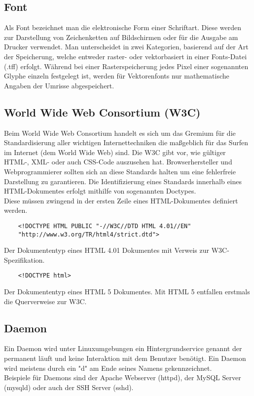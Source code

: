 	\subsection{Font}
	Als Font bezeichnet man die elektronische Form einer Schriftart. Diese werden zur Darstellung von Zeichenketten auf Bildschirmen oder für die Ausgabe am Drucker verwendet. Man unterscheidet in zwei Kategorien, basierend auf der Art der Speicherung, welche entweder raster- oder vektorbasiert in einer Fonts-Datei (.tff) erfolgt.
	Während bei einer Rasterspeicherung jedes Pixel einer sogenannten Glyphe einzeln festgelegt ist, werden für Vektorenfonts nur mathematische Angaben der Umrisse abgespeichert.
	
	\lstset{frame=shadowbox, breaklines=true}

	\subsection{World Wide Web Consortium (W3C)}
		Beim World Wide Web Consortium handelt es sich um das Gremium für die Standardisierung aller wichtigen Internettechniken die maßgeblich für das Surfen im Internet (dem World Wide Web) sind.
		Die W3C gibt vor, wie gültiger HTML-, XML- oder auch CSS-Code auszusehen hat.
		Browserhersteller und Webprogrammierer sollten sich an diese Standards halten um eine fehlerfreie Darstellung zu garantieren. Die Identifizierung eines Standards innerhalb eines HTML-Dokumentes erfolgt mithilfe von sogenannten Doctypes.\\
		Diese müssen zwingend in der ersten Zeile eines HTML-Dokumentes definiert werden.
	
	\begin{lstlisting}
	<!DOCTYPE HTML PUBLIC "-//W3C//DTD HTML 4.01//EN"
	"http://www.w3.org/TR/html4/strict.dtd">
	\end{lstlisting}
		Der Dokumententyp eines HTML 4.01 Dokumentes mit Verweis zur W3C-Spezifikation.\\
	
	\begin{lstlisting}
	<!DOCTYPE html>
	\end{lstlisting}
		Der Dokumententyp eines HTML 5 Dokumentes. Mit HTML 5 entfallen erstmals die Querverweise zur W3C.
		
	\subsection{Daemon}
		Ein Daemon wird unter Linuxumgebungen ein Hintergrundservice genannt der permanent läuft und keine Interaktion mit dem Benutzer benötigt.
		Ein Daemon wird meistens durch ein "d" am Ende seines Namens gekennzeichnet.\\
		Beispiele für Daemons sind der Apache Webserver (httpd), der MySQL Server (mysqld) oder auch der SSH Server (sshd).
		
